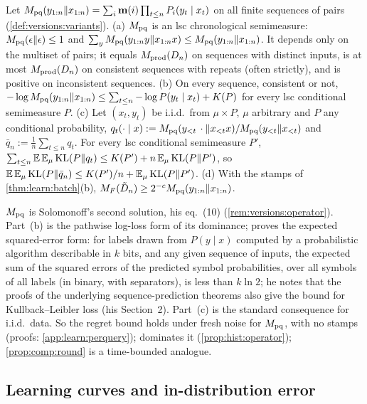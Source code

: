 \begin{proposition}\label{prop:learn:perquery}
Let $M_{\mathrm{pq}}(y_{1:n}\Vert x_{1:n})=\sum_i\mathbf{m}(i)\prod_{t\le n}P_i(y_t\mid x_t)$ on all finite sequences of pairs (\cref{def:versions:variants}).
(a) $M_{\mathrm{pq}}$ is an lsc chronological semimeasure: $M_{\mathrm{pq}}(\epsilon\Vert\epsilon)\le1$ and $\sum_yM_{\mathrm{pq}}(y_{1:n}y\Vert x_{1:n}x)\le M_{\mathrm{pq}}(y_{1:n}\Vert x_{1:n})$. It depends only on the multiset of pairs; it equals $M_{\mathrm{prod}}(D_n)$ on sequences with distinct inputs, is at most $M_{\mathrm{prod}}(D_n)$ on consistent sequences with repeats (often strictly), and is positive on inconsistent sequences.
(b) On every sequence, consistent or not, $-\log M_{\mathrm{pq}}(y_{1:n}\Vert x_{1:n})\le\sum_{t\le n}-\log P(y_t\mid x_t)+K(P)$ for every lsc conditional semimeasure $P$.
(c) Let $(x_t,y_t)$ be i.i.d.\ from $\mu\times P$, $\mu$ arbitrary and $P$ any conditional probability, $q_t(\cdot\mid x):=M_{\mathrm{pq}}(y_{<t}\,\cdot\Vert x_{<t}x)/M_{\mathrm{pq}}(y_{<t}\Vert x_{<t})$ and $\bar q_n:=\frac1n\sum_{t\le n}q_t$. For every lsc conditional semimeasure $P'$, $\sum_{t\le n}\mathbb{E}\,\mathbb{E}_\mu\operatorname{KL}(P\|q_t)\le K(P')+n\,\mathbb{E}_\mu\operatorname{KL}(P\|P')$, so $\mathbb{E}\,\mathbb{E}_\mu\operatorname{KL}(P\|\bar q_n)\le K(P')/n+\mathbb{E}_\mu\operatorname{KL}(P\|P')$.
(d) With the stamps of \cref{thm:learn:batch}(b), $M_{F}(\tilde D_n)\ge2^{-c}M_{\mathrm{pq}}(y_{1:n}\Vert x_{1:n})$.
\end{proposition}

$M_{\mathrm{pq}}$ is Solomonoff's second solution, his eq.~(10) (\cref{rem:versions:operator}). Part~(b) is the pathwise log-loss form of its dominance; \citet[eq.~(12)]{solomonoff2008three} proves the expected squared-error form: for labels drawn from $P(y\mid x)$ computed by a probabilistic algorithm describable in $k$ bits, and any given sequence of inputs, the expected sum of the squared errors of the predicted symbol probabilities, over all symbols of all labels (in binary, with separators), is less than $k\ln2$; he notes that the proofs of the underlying sequence-prediction theorems also give the bound for Kullback--Leibler loss (his Section~2). Part~(c) is the standard consequence for i.i.d.\ data. So the regret bound holds under fresh noise for $M_{\mathrm{pq}}$, with no stamps (proofs: \cref{app:learn:perquery}); \SFIhist{} dominates it (\cref{prop:hist:operator}); \cref{prop:comp:round} is a time-bounded analogue.

\subsection{Learning curves and in-distribution error}\label{sec:learn:curves}

